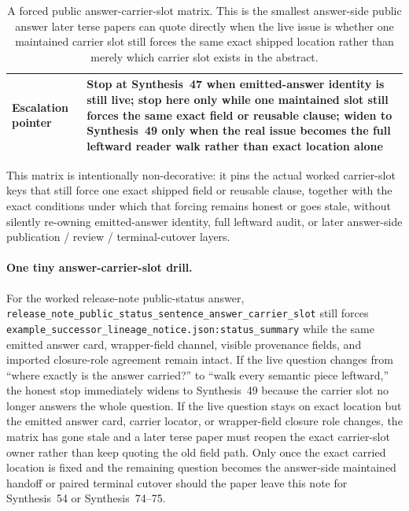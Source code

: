 \documentclass[11pt]{article}
\begin{document}
\begin{table}[t]
\begin{tabularx}{\linewidth}{@{}lX@{}}
Escalation pointer & Stop at Synthesis~47 when emitted-answer identity is still live; stop here only while one maintained slot still forces the same exact field or reusable clause; widen to Synthesis~49 only when the real issue becomes the full leftward reader walk rather than exact location alone \\
\bottomrule
\end{tabularx}
\caption{A forced public answer-carrier-slot matrix. This is the smallest answer-side public answer later terse papers can quote directly when the live issue is whether one maintained carrier slot still forces the same exact shipped location rather than merely which carrier slot exists in the abstract.}
\label{tab:forced-public-answer-carrier-slot-matrix}
\end{table}

This matrix is intentionally non-decorative: it pins the actual worked carrier-slot keys that still force one exact shipped field or reusable clause, together with the exact conditions under which that forcing remains honest or goes stale, without silently re-owning emitted-answer identity, full leftward audit, or later answer-side publication / review / terminal-cutover layers.\cite{series:workedexample}

\paragraph{One tiny answer-carrier-slot drill.}
For the worked release-note public-status answer, \nolinkurl{release_note_public_status_sentence_answer_carrier_slot} still forces \nolinkurl{example_successor_lineage_notice.json:status_summary} while the same emitted answer card, wrapper-field channel, visible provenance fields, and imported closure-role agreement remain intact. If the live question changes from ``where exactly is the answer carried?'' to ``walk every semantic piece leftward,'' the honest stop immediately widens to Synthesis~49 because the carrier slot no longer answers the whole question. If the live question stays on exact location but the emitted answer card, carrier locator, or wrapper-field closure role changes, the matrix has gone stale and a later terse paper must reopen the exact carrier-slot owner rather than keep quoting the old field path. Only once the exact carried location is fixed and the remaining question becomes the answer-side maintained handoff or paired terminal cutover should the paper leave this note for Synthesis~54 or Synthesis~74--75.\cite{series:workedexample}
\end{document}
